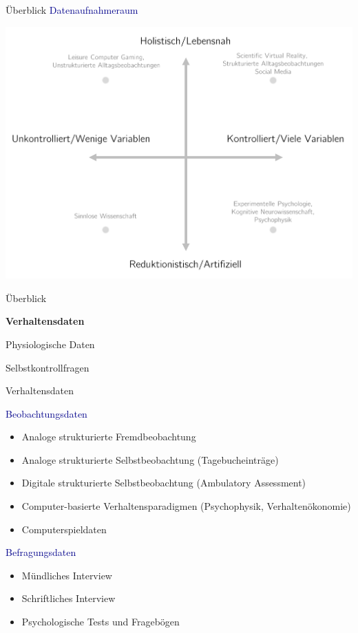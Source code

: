 \documentclass[
  8pt,
  ignorenonframetext,
]{beamer}
\providecommand{\tightlist}{%
  \setlength{\itemsep}{0pt}\setlength{\parskip}{0pt}}
\begin{document}
\begin{frame}{Überblick}
\protect\hypertarget{uxfcberblick-8}{}
\textcolor{darkblue}{Datenaufnahmeraum} \vspace{-1mm}

\begin{center}\includegraphics[width=0.85\linewidth]{3_Abbildungen/pfm_3_datenaufnahmeraum} \end{center}
\end{frame}

\begin{frame}{}
\protect\hypertarget{section-3}{}
\Large
{}
\vfill

Überblick

\textbf{Verhaltensdaten}

Physiologische Daten

Selbstkontrollfragen \vfill
\end{frame}

\begin{frame}{Verhaltensdaten}
\protect\hypertarget{verhaltensdaten}{}

\textcolor{darkblue}{Beobachtungsdaten}

\begin{itemize}
\tightlist
\item
  Analoge strukturierte Fremdbeobachtung
\item
  Analoge strukturierte Selbstbeobachtung (Tagebucheinträge)
\item
  Digitale strukturierte Selbstbeobachtung (Ambulatory Assessment)
\item
  Computer-basierte Verhaltensparadigmen (Psychophysik,
  Verhaltenökonomie)
\item
  Computerspieldaten
\end{itemize}

\textcolor{darkblue}{Befragungsdaten}

\begin{itemize}
\tightlist
\item
  Mündliches Interview
\item
  Schriftliches Interview
\item
  Psychologische Tests und Fragebögen
\end{itemize}
\end{frame}
\end{document}
